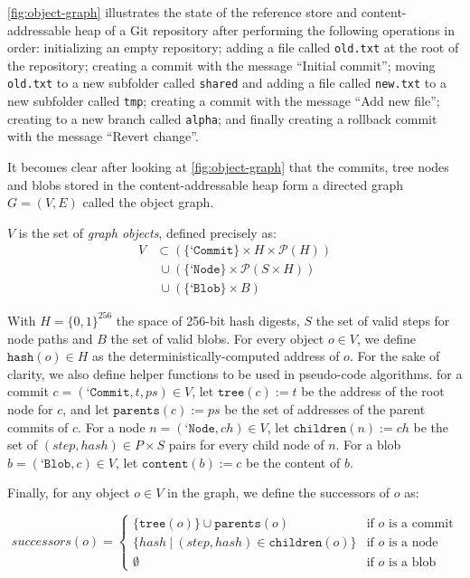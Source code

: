 

\bigskip
\cref{fig:object-graph} illustrates the state of the reference store and content-addressable heap of a Git repository after performing the following operations in order: initializing an empty repository; adding a file called \texttt{old.txt} at the root of the repository; creating a commit with the message ``Initial commit''; moving \texttt{old.txt} to a new subfolder called \texttt{shared} and adding a file called \texttt{new.txt} to a new subfolder called \texttt{tmp}; creating a commit with the message ``Add new file''; creating to a new branch called \texttt{alpha}; and finally creating a rollback commit with the message ``Revert change''.

\bigskip
It becomes clear after looking at \cref{fig:object-graph} that the commits, tree nodes and blobs stored in the content-addressable heap form a directed graph \(G = (V, E)\) called the object graph.

\(V\) is the set of \emph{graph objects}, defined precisely as:
\begin{align*}
  V & \subset (\{\texttt{`Commit}\} \times H \times \mathcal{P}(H)) \\
    & \ \cup  (\{\texttt{`Node}\} \times \mathcal{P}(S \times H))   \\
    & \ \cup  (\{\texttt{`Blob}\} \times B)
\end{align*}

With \(H = \{0, 1\}^{256}\) the space of 256-bit hash digests, \(S\) the set of valid steps for node paths and \(B\) the set of valid blobs. For every object \(o \in V\), we define \(\texttt{hash}(o) \in H\) as the deterministically-computed address of \(o\). For the sake of clarity, we also define helper functions to be used in pseudo-code algorithms. for a commit \(c = (\texttt{`Commit}, t, ps) \in V\), let \(\texttt{tree}(c) := t\) be the address of the root node for \(c\), and let \(\texttt{parents}(c) := ps\) be the set of addresses of the parent commits of \(c\). For a node \(n = (\texttt{`Node}, ch) \in V\), let \(\texttt{children}(n) := ch\) be the set of \((step, hash) \in P \times S\) pairs for every child node of \(n\). For a blob \(b = (\texttt{`Blob}, c) \in V\), let \(\texttt{content}(b) := c\) be the content of \(b\).

Finally, for any object \(o \in V\) in the graph, we define the successors of \(o\) as:

\begin{equation*}
  successors(o) =
  \begin{cases}
    \{\texttt{tree}(o)\} \cup \texttt{parents}(o)         & \text{if $o$ is a commit}
    \\
    \{hash \ | \ (step, hash) \in \texttt{children}(o) \} & \text{if $o$ is a node}
    \\
    \emptyset                                             & \text{if $o$ is a blob}
  \end{cases}
\end{equation*}

